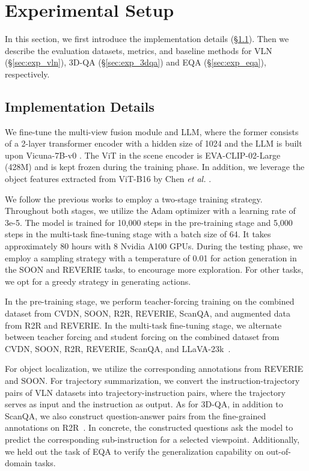 





\section{Experimental Setup}
In this section, we first introduce the implementation details (\S \ref{sec:implementation}). Then we describe the evaluation datasets, metrics, and baseline methods for VLN (\S \ref{sec:exp_vln}), 3D-QA (\S \ref{sec:exp_3dqa}) and EQA (\S \ref{sec:exp_eqa}), respectively.

\subsection{Implementation Details}
\label{sec:implementation}

 We fine-tune the multi-view fusion module and LLM, where the former consists of a 2-layer transformer encoder with a hidden size of 1024 and the LLM is built upon Vicuna-7B-v0 \cite{peng2023instruction}. The ViT in the scene encoder is EVA-CLIP-02-Large (428M) \cite{EVA-CLIP} and is kept frozen during the training phase.
In addition, we leverage the object features extracted from ViT-B16 by Chen \textit{et al.} \cite{chen2022learning}.


 We follow the previous works \cite{Chen_2022_CVPR, Gao_2023_CVPR, Chen_2022_HM3D_AutoVLN} to employ a two-stage training strategy.
Throughout both stages, we utilize the Adam optimizer with a learning rate of 3e-5. The model is trained for 10,000 steps in the pre-training stage and 5,000 steps in the multi-task fine-tuning stage with a batch size of 64.
It takes approximately 80 hours with 8 Nvidia A100 GPUs.
During the testing phase, we employ a sampling strategy with a temperature of 0.01 for action generation in the SOON and REVERIE tasks, to encourage more exploration. For other tasks, we opt for a greedy strategy in generating actions.

 In the pre-training stage, we perform teacher-forcing training on the combined dataset from CVDN, SOON, R2R, REVERIE, ScanQA, and augmented data from R2R and REVERIE. 
In the multi-task fine-tuning stage, we alternate between teacher forcing and student forcing on the combined dataset from CVDN, SOON, R2R, REVERIE, ScanQA, and LLaVA-23k~\cite{liu2023visual}.

For object localization, we utilize the corresponding annotations from REVERIE and SOON.
For trajectory summarization, we convert the instruction-trajectory pairs of VLN datasets into trajectory-instruction pairs, where the trajectory serves as input and the instruction as output. 
As for 3D-QA, in addition to ScanQA, we also construct question-answer pairs from the fine-grained annotations on R2R~\cite{hong2020sub}.
In concrete, the constructed questions ask the model to predict the corresponding sub-instruction for a selected viewpoint.
Additionally, we held out the task of EQA to verify the generalization capability on out-of-domain tasks.


